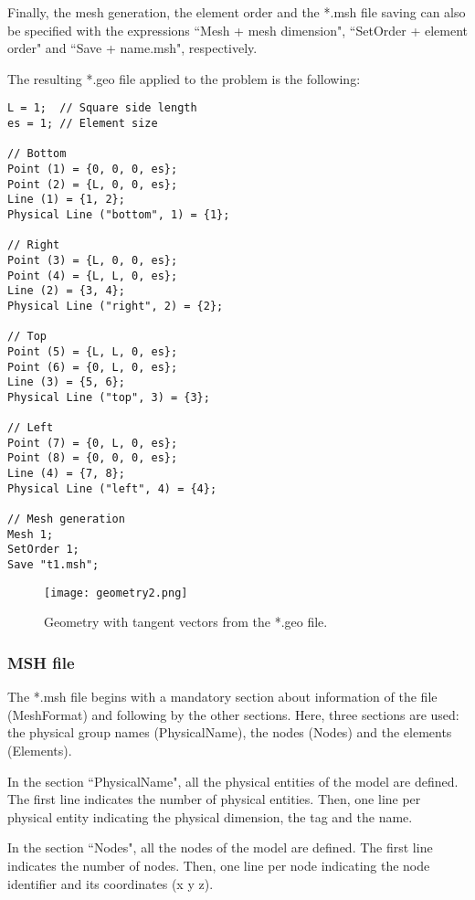 \documentclass[A4]{article}
\begin{document}
Finally, the mesh generation, the element order and the *.msh file saving can also be specified with the expressions ``Mesh + mesh dimension", ``SetOrder + element order" and ``Save + name.msh", respectively.

The resulting *.geo file applied to the problem is the following:

\begin{Verbatim}
L = 1;  // Square side length
es = 1; // Element size

// Bottom
Point (1) = {0, 0, 0, es};
Point (2) = {L, 0, 0, es};
Line (1) = {1, 2};
Physical Line ("bottom", 1) = {1};

// Right
Point (3) = {L, 0, 0, es};
Point (4) = {L, L, 0, es};
Line (2) = {3, 4};
Physical Line ("right", 2) = {2};

// Top
Point (5) = {L, L, 0, es};
Point (6) = {0, L, 0, es};
Line (3) = {5, 6};
Physical Line ("top", 3) = {3};

// Left
Point (7) = {0, L, 0, es};
Point (8) = {0, 0, 0, es};
Line (4) = {7, 8};
Physical Line ("left", 4) = {4};

// Mesh generation
Mesh 1;
SetOrder 1;
Save "t1.msh";
\end{Verbatim}

\begin{figure}[h]
	\centering
	\texttt{[image: geometry2.png]}
	\caption{Geometry with tangent vectors from the *.geo file.}
	\label{fig:geometry}
\end{figure}

\subsubsection{MSH file}

The *.msh file begins with a mandatory section about information of the file (MeshFormat) and following by the other sections. Here, three sections are used: the physical group names (PhysicalName), the nodes (Nodes) and the elements (Elements).

In the section ``PhysicalName", all the physical entities of the model are defined. The first line indicates the number of physical entities. Then, one line per physical entity indicating the physical dimension, the tag and the name.  
   
In the section ``Nodes", all the nodes of the model are defined. The first line indicates the number of nodes. Then, one line per node indicating the node identifier and its coordinates (x y z).
\end{document}
